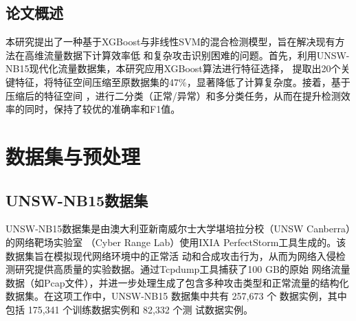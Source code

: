 \documentclass{article}
\begin{document}
\subsection{论文概述}
本研究提出了一种基于XGBoost与非线性SVM的混合检测模型，旨在解决现有方法在高维流量数据下计算效率低
和复杂攻击识别困难的问题。首先，利用UNSW-NB15现代化流量数据集，本研究应用XGBoost算法进行特征选择，
提取出20个关键特征，将特征空间压缩至原数据集的47\%，显著降低了计算复杂度。接着，基于压缩后的特征空间
，进行二分类（正常/异常）和多分类任务，从而在提升检测效率的同时，保持了较优的准确率和F1值。




\section{数据集与预处理}
\subsection{UNSW-NB15数据集}
UNSW-NB15数据集是由澳大利亚新南威尔士大学堪培拉分校（UNSW Canberra）的网络靶场实验室
（Cyber Range Lab）使用IXIA PerfectStorm工具生成的。该数据集旨在模拟现代网络环境中的正常活
动和合成攻击行为，从而为网络入侵检测研究提供高质量的实验数据。通过Tcpdump工具捕获了100 GB的原始
网络流量数据（如Pcap文件），并进一步处理生成了包含多种攻击类型和正常流量的结构化数据集。在这项工作中，UNSW-NB15 
数据集中共有 257,673 个
数据实例，其中包括 175,341 个训练数据实例和 82,332 个测
试数据实例。
\end{document}
